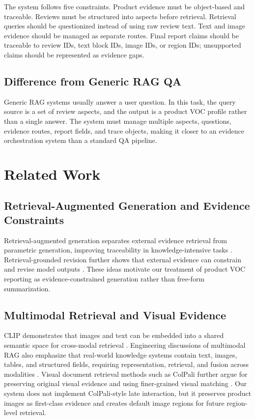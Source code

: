 \documentclass[11pt]{article}
\begin{document}
The system follows five constraints. Product evidence must be object-based and traceable. Reviews must be structured into aspects before retrieval. Retrieval queries should be questionized instead of using raw review text. Text and image evidence should be managed as separate routes. Final report claims should be traceable to review IDs, text block IDs, image IDs, or region IDs; unsupported claims should be represented as evidence gaps.

\subsection{Difference from Generic RAG QA}

Generic RAG systems usually answer a user question. In this task, the query source is a set of review aspects, and the output is a product VOC profile rather than a single answer. The system must manage multiple aspects, questions, evidence routes, report fields, and trace objects, making it closer to an evidence orchestration system than a standard QA pipeline.

\section{Related Work}
\subsection{Retrieval-Augmented Generation and Evidence Constraints}

Retrieval-augmented generation separates external evidence retrieval from parametric generation, improving traceability in knowledge-intensive tasks \citep{lewis2020retrievalAugmentedGeneration}. Retrieval-grounded revision further shows that external evidence can constrain and revise model outputs \citep{gao2023rarr}. These ideas motivate our treatment of product VOC reporting as evidence-constrained generation rather than free-form summarization.

\subsection{Multimodal Retrieval and Visual Evidence}

CLIP demonstrates that images and text can be embedded into a shared semantic space for cross-modal retrieval \citep{radford2021clip}. Engineering discussions of multimodal RAG also emphasize that real-world knowledge systems contain text, images, tables, and structured fields, requiring representation, retrieval, and fusion across modalities \citep{nvidia2024multimodalRagIntro,nvidia2024aiReadyKnowledgeSystems}. Visual document retrieval methods such as ColPali further argue for preserving original visual evidence and using finer-grained visual matching \citep{faysse2024colpali}. Our system does not implement ColPali-style late interaction, but it preserves product images as first-class evidence and creates default image regions for future region-level retrieval.
\end{document}

